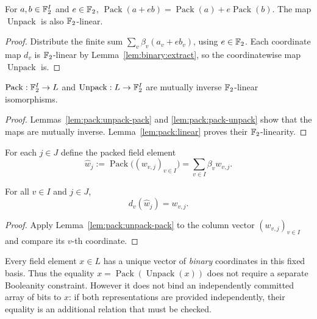 \begin{lemma}\label{lem:pack:linear}
For $a,b\in\mathbb{F}_2^I$ and $e\in\mathbb{F}_2$,
$\operatorname{Pack}(a+eb)=
\operatorname{Pack}(a)+e\operatorname{Pack}(b)$.
The map $\operatorname{Unpack}$ is also $\mathbb{F}_2$-linear.
\end{lemma}
\begin{proof}
Distribute the finite sum
$\sum_v\beta_v(a_v+eb_v)$, using
$e\in\mathbb{F}_2$. Each coordinate map $d_v$ is
$\mathbb{F}_2$-linear by Lemma~\ref{lem:binary:extract},
so the coordinatewise map $\operatorname{Unpack}$ is.
\end{proof}

\begin{theorem}\label{thm:pack:bijection}
$\operatorname{Pack}:\mathbb{F}_2^I\to L$ and
$\operatorname{Unpack}:L\to\mathbb{F}_2^I$ are mutually inverse
$\mathbb{F}_2$-linear isomorphisms.
\end{theorem}
\begin{proof}
Lemmas~\ref{lem:pack:unpack-pack} and
\ref{lem:pack:pack-unpack} show that the maps are
mutually inverse. Lemma~\ref{lem:pack:linear}
proves their $\mathbb{F}_2$-linearity.
\end{proof}

\begin{definition}\label{def:pack:columns}
For each $j\in J$ define the packed field element
\[
 \widehat w_j:=\operatorname{Pack}
                    \bigl((w_{v,j})_{v\in I}\bigr)
             =\sum_{v\in I}\beta_vw_{v,j}.
\]
\end{definition}

\begin{corollary}\label{cor:pack:column-bits}
For all $v\in I$ and $j\in J$,
\[
 \boxed{d_v(\widehat w_j)=w_{v,j}.}
\]
\end{corollary}
\begin{proof}
Apply Lemma~\ref{lem:pack:unpack-pack} to the
column vector $(w_{v,j})_{v\in I}$ and compare
its $v$-th coordinate.
\end{proof}

\begin{remark}
Every field element $x\in L$ has a unique vector of
\emph{binary} coordinates in this fixed basis. Thus
the equality $x=\operatorname{Pack}(\operatorname{Unpack}(x))$
does not require a separate Booleanity constraint.
However it does not bind an independently committed
array of bits to $x$: if both representations are
provided independently, their equality is an
additional relation that must be checked.
\end{remark}

